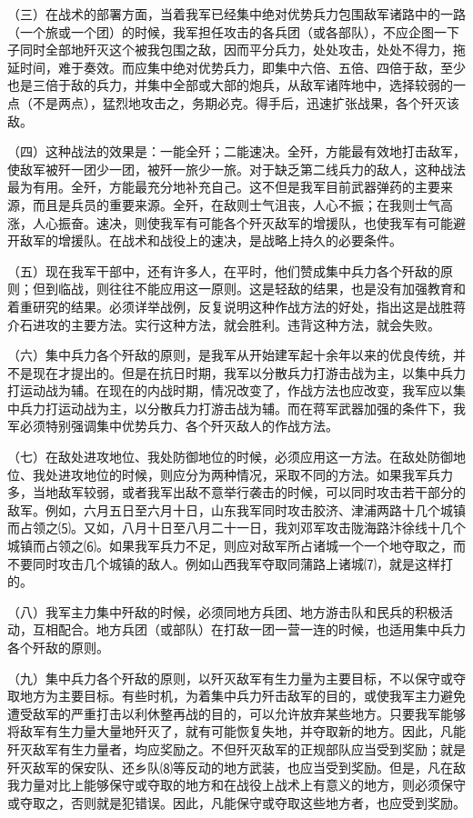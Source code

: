 \documentclass[UTF-8, a5paper, 12pt]{ctexart}
\begin{document}
（三）在战术的部署方面，当着我军已经集中绝对优势兵力包围敌军诸路中的一路（一个旅或一个团）的时候，我军担任攻击的各兵团（或各部队），不应企图一下子同时全部地歼灭这个被我包围之敌，因而平分兵力，处处攻击，处处不得力，拖延时间，难于奏效。而应集中绝对优势兵力，即集中六倍、五倍、四倍于敌，至少也是三倍于敌的兵力，并集中全部或大部的炮兵，从敌军诸阵地中，选择较弱的一点（不是两点），猛烈地攻击之，务期必克。得手后，迅速扩张战果，各个歼灭该敌。

（四）这种战法的效果是：一能全歼；二能速决。全歼，方能最有效地打击敌军，使敌军被歼一团少一团，被歼一旅少一旅。对于缺乏第二线兵力的敌人，这种战法最为有用。全歼，方能最充分地补充自己。这不但是我军目前武器弹药的主要来源，而且是兵员的重要来源。全歼，在敌则士气沮丧，人心不振；在我则士气高涨，人心振奋。速决，则使我军有可能各个歼灭敌军的增援队，也使我军有可能避开敌军的增援队。在战术和战役上的速决，是战略上持久的必要条件。

（五）现在我军干部中，还有许多人，在平时，他们赞成集中兵力各个歼敌的原则；但到临战，则往往不能应用这一原则。这是轻敌的结果，也是没有加强教育和着重研究的结果。必须详举战例，反复说明这种作战方法的好处，指出这是战胜蒋介石进攻的主要方法。实行这种方法，就会胜利。违背这种方法，就会失败。

（六）集中兵力各个歼敌的原则，是我军从开始建军起十余年以来的优良传统，并不是现在才提出的。但是在抗日时期，我军以分散兵力打游击战为主，以集中兵力打运动战为辅。在现在的内战时期，情况改变了，作战方法也应改变，我军应以集中兵力打运动战为主，以分散兵力打游击战为辅。而在蒋军武器加强的条件下，我军必须特别强调集中优势兵力、各个歼灭敌人的作战方法。

（七）在敌处进攻地位、我处防御地位的时候，必须应用这一方法。在敌处防御地位、我处进攻地位的时候，则应分为两种情况，采取不同的方法。如果我军兵力多，当地敌军较弱，或者我军出敌不意举行袭击的时候，可以同时攻击若干部分的敌军。例如，六月五日至六月十日，山东我军同时攻击胶济、津浦两路十几个城镇而占领之⑸。又如，八月十日至八月二十一日，我刘邓军攻击陇海路汴徐线十几个城镇而占领之⑹。如果我军兵力不足，则应对敌军所占诸城一个一个地夺取之，而不要同时攻击几个城镇的敌人。例如山西我军夺取同蒲路上诸城⑺，就是这样打的。

（八）我军主力集中歼敌的时候，必须同地方兵团、地方游击队和民兵的积极活动，互相配合。地方兵团（或部队）在打敌一团一营一连的时候，也适用集中兵力各个歼敌的原则。

（九）集中兵力各个歼敌的原则，以歼灭敌军有生力量为主要目标，不以保守或夺取地方为主要目标。有些时机，为着集中兵力歼击敌军的目的，或使我军主力避免遭受敌军的严重打击以利休整再战的目的，可以允许放弃某些地方。只要我军能够将敌军有生力量大量地歼灭了，就有可能恢复失地，并夺取新的地方。因此，凡能歼灭敌军有生力量者，均应奖励之。不但歼灭敌军的正规部队应当受到奖励；就是歼灭敌军的保安队、还乡队⑻等反动的地方武装，也应当受到奖励。但是，凡在敌我力量对比上能够保守或夺取的地方和在战役上战术上有意义的地方，则必须保守或夺取之，否则就是犯错误。因此，凡能保守或夺取这些地方者，也应受到奖励。
\end{document}
